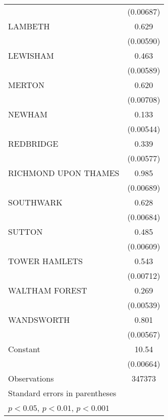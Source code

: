 {\begin{longtable}{l*{1}{c}}
                    &   (0.00687)         \\
\addlinespace
LAMBETH             &       0.629\sym{***}\\
                    &   (0.00590)         \\
\addlinespace
LEWISHAM            &       0.463\sym{***}\\
                    &   (0.00589)         \\
\addlinespace
MERTON              &       0.620\sym{***}\\
                    &   (0.00708)         \\
\addlinespace
NEWHAM              &       0.133\sym{***}\\
                    &   (0.00544)         \\
\addlinespace
REDBRIDGE           &       0.339\sym{***}\\
                    &   (0.00577)         \\
\addlinespace
RICHMOND UPON THAMES&       0.985\sym{***}\\
                    &   (0.00689)         \\
\addlinespace
SOUTHWARK           &       0.628\sym{***}\\
                    &   (0.00684)         \\
\addlinespace
SUTTON              &       0.485\sym{***}\\
                    &   (0.00609)         \\
\addlinespace
TOWER HAMLETS       &       0.543\sym{***}\\
                    &   (0.00712)         \\
\addlinespace
WALTHAM FOREST      &       0.269\sym{***}\\
                    &   (0.00539)         \\
\addlinespace
WANDSWORTH          &       0.801\sym{***}\\
                    &   (0.00567)         \\
\addlinespace
Constant            &       10.54\sym{***}\\
                    &   (0.00664)         \\
\midrule
Observations        &      347373         \\
\bottomrule
\multicolumn{2}{l}{\footnotesize Standard errors in parentheses}\\
\multicolumn{2}{l}{\footnotesize \sym{*} \(p<0.05\), \sym{**} \(p<0.01\), \sym{***} \(p<0.001\)}\\
\end{longtable}
}
